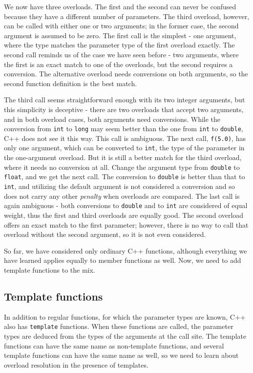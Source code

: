 We now have three overloads. The first and the second can never be confused because they have a different number of parameters. The third overload, however, can be called with either one or two arguments; in the former case, the second argument is assumed to be zero. The first call is the simplest - one argument, where the type matches the parameter type of the first overload exactly. The second call reminds us of the case we have seen before - two arguments, where the first is an exact match to one of the overloads, but the second requires a conversion. The alternative overload needs conversions on both arguments, so the second function definition is the best match.

The third call seems straightforward enough with its two integer arguments, but this simplicity is deceptive - there are two overloads that accept two arguments, and in both overload cases, both arguments need conversions. While the conversion from \texttt{int} to \texttt{long} may seem better than the one from \texttt{int} to \texttt{double}, C++ does not see it this way. This call is ambiguous. The next call, \texttt{f(5.0)}, has only one argument, which can be converted to \texttt{int}, the type of the parameter in the one-argument overload. But it is still a better match for the third overload, where it needs no conversion at all. Change the argument type from \texttt{double} to \texttt{float}, and we get the next call. The conversion to \texttt{double} is better than that to \texttt{int}, and utilizing the default argument is not considered a conversion and so does not carry any other \emph{penalty} when overloads are compared. The last call is again ambiguous - both conversions to \texttt{double} and to \texttt{int} are considered of equal weight, thus the first and third overloads are equally good. The second overload offers an exact match to the first parameter; however, there is no way to call that overload without the second argument, so it is not even considered.

So far, we have considered only ordinary C++ functions, although everything we have learned applies equally to member functions as well. Now, we need to add template functions to the mix.

\subsection{Template functions}

In addition to regular functions, for which the parameter types are known, C++ also has \texttt{template} functions. When these functions are called, the parameter types are deduced from the types of the arguments at the call site. The template functions can have the same name as non-template functions, and several template functions can have the same name as well, so we need to learn about overload resolution in the presence of templates.


